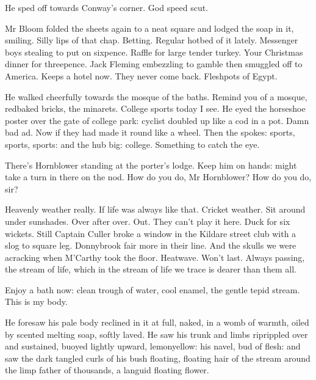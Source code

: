 He sped off towards Conway's corner.
God speed scut.

Mr Bloom folded the sheets again to a neat square
and lodged the soap in it,
smiling.
Silly lips of that chap.
Betting.
Regular hotbed of it lately.
Messenger boys stealing to put on sixpence.
Raffle for large tender turkey.
Your Christmas dinner for threepence.
Jack Fleming embezzling to gamble
then smuggled off to America.
Keeps a hotel now.
They never come back.
Fleshpots of Egypt.

He walked cheerfully towards the mosque of the baths.
Remind you of a mosque,
redbaked bricks, the minarets.
College sports today I see.
He eyed the horseshoe poster over the gate of college park:
cyclist doubled up like a cod in a pot.
Damn bad ad.
Now if they had made it round like a wheel.
Then the spokes:
sports, sports, sports: and the hub big:
college.
Something to catch the eye.

There's Hornblower standing at the porter's lodge.
Keep him on hands:
might take a turn in there on the nod.
How do you do, Mr Hornblower?
How do you do, sir?

Heavenly weather really.
If life was always like that.
Cricket weather.
Sit around under sunshades.
Over after over.
Out.
They can't play it here.
Duck for six wickets.
Still Captain Culler broke a window in the Kildare street club
with a slog to square leg.
Donnybrook fair more in their line.
And the skulls we were acracking when M'Carthy took the floor.
Heatwave.
Won't last.
Always passing,
the stream of life,
which in the stream of life we trace
is dearer than them all.

Enjoy a bath now:
clean trough of water,
cool enamel,
the gentle tepid stream.
This is my body.

He foresaw his pale body reclined in it at full,
naked,
in a womb of warmth,
oiled by scented melting soap,
softly laved.
He saw his trunk and limbs riprippled over
and sustained,
buoyed lightly upward,
lemonyellow:
his navel, bud of flesh:
and saw the dark tangled curls of his bush
floating,
floating hair of the stream
around the limp father of thousands,
a languid floating flower.


